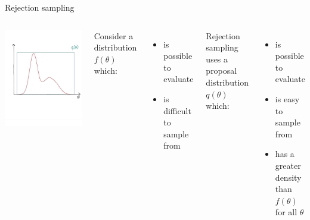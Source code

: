 \documentclass[compress]{beamer}
\begin{document}
\begin{frame}[label=sec-5-3]{Rejection sampling}
\begin{columns}[c] 
\includegraphics[width=.8\linewidth]{RS2.png}

Consider a distribution $f(\theta)$ which:
\begin{itemize}
\item is possible to evaluate
\item is difficult to sample from
\end{itemize}
Rejection sampling uses a \alert{proposal distribution $q(\theta)$} which:
\begin{itemize}
\item is possible to evaluate
\item is easy to sample from
\item has a greater density than $f(\theta)$ for all $\theta$
\end{itemize}
\end{columns}
\end{frame}
\end{document}
